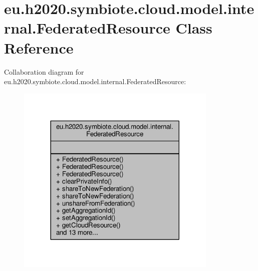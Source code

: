 \hypertarget{classeu_1_1h2020_1_1symbiote_1_1cloud_1_1model_1_1internal_1_1FederatedResource}{}\section{eu.\+h2020.\+symbiote.\+cloud.\+model.\+internal.\+Federated\+Resource Class Reference}
\label{classeu_1_1h2020_1_1symbiote_1_1cloud_1_1model_1_1internal_1_1FederatedResource}


Collaboration diagram for eu.\+h2020.\+symbiote.\+cloud.\+model.\+internal.\+Federated\+Resource\+:
\nopagebreak
\begin{figure}[H]
\begin{center}
\leavevmode
\includegraphics[width=272pt]{classeu_1_1h2020_1_1symbiote_1_1cloud_1_1model_1_1internal_1_1FederatedResource__coll__graph}
\end{center}
\end{figure}
